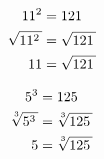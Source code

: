 {
\small
\begin{tcbraster}[
    raster columns = 2,
    raster left skip = 1.5in, raster right skip = 1.5in, 
    raster column skip = 0.5in,
]
\begin{tcolorbox}[]
    \vspace{-1\baselineskip}
    \begin{align*} 
        11^2          &= 121 \\
        \myRoot{11^2} &= \myRoot{121} \\
        11            &= \myRoot{121} \\
    \end{align*}
    \vspace{-2.75\baselineskip}
\end{tcolorbox}
\begin{tcolorbox}[]
    \vspace{-1\baselineskip}
    \begin{align*} 
        5^3             &= 125 \\
        \myRoot[3]{5^3} &= \myRoot[3]{125} \\
        5               &= \myRoot[3]{125} \\
    \end{align*}
    \vspace{-2.75\baselineskip}
\end{tcolorbox}
\end{tcbraster}
}